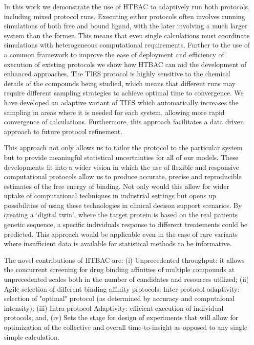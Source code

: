 In this work we demonstrate the use of HTBAC to adaptively run both protocols,
including mixed protocol runs. Executing either protocols often involves
running simulations of both free and  bound  ligand, with the later involving
a much larger system than the former. This means that even single calculations
must coordinate simulations with heterogeneous computational requirements.
Further to the use of a common framework to improve the ease of deployment and
efficiency of execution of existing protocols we show how HTBAC can aid the
development of enhanced approaches. The TIES protocol is highly sensitive to
the chemical details of the compounds being studied, which means that
different runs may require different sampling strategies to achieve optimal
time to convergence. We have developed an adaptive variant of TIES which
automatically increases the sampling in areas where it is needed for each
system, allowing more rapid convergence of calculations. Furthermore, this
approach facilitates a data driven approach to future protocol refinement.

This approach not only allows us to tailor the protocol to the particular
system but to provide meaningful statistical uncertainties for all of our
models. These developments fit into a wider vision in which the use of
flexible and responsive computational protocols allow us to produce accurate,
precise and reproducible estimates of the free energy of binding. Not only
would this allow for wider uptake of computational techniques in industrial
settings but opens up possibilities of using these technologies in clinical
decison support scenarios. By creating a `digital twin', where the target
protein is based on the real patients genetic sequence, a specific individuals
response to different treatements could be predicted. This approach would be
applicable even in the case of rare variants where insufficient data is
available for statistical methods to be informative.

The novel contributions of HTBAC are: (i) Unprecedented throughput: it allows
the concurrent screening for drug binding affinities of multiple compounds at
unprecedented scales both in the number of candidates and resources utilized;
(ii) Agile selection of different binding affinity protocols: Inter-protocol
adaptivity: selection of "optimal" protocol (as determined by accuracy and
computaional intensity); (iii) Intra-protocol Adaptivity: efficient execution
of individual protocols; and, (iv) Sets the stage for design of experiments
that will allow for optimization of the collective and overall  
time-to-insight as opposed to any single simple calculation.


